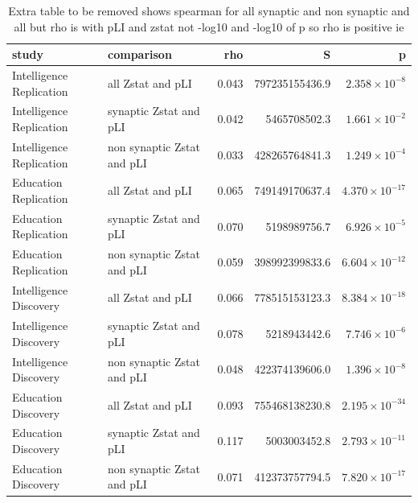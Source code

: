 \begin{table}[ht]
\centering
\begin{adjustbox}{max width=\textwidth}
\begin{tabular}{llrrr}
  \hline
study & comparison & rho & S & p \\ 
  \hline
Intelligence Replication & all Zstat and pLI & 0.043 & 797235155436.9 & $2.358 \times 10^{-8}$ \\ 
  Intelligence Replication & synaptic Zstat and pLI & 0.042 & 5465708502.3 & $1.661 \times 10^{-2}$ \\ 
  Intelligence Replication & non synaptic Zstat and pLI & 0.033 & 428265764841.3 & $1.249 \times 10^{-4}$ \\ 
  Education Replication & all Zstat and pLI & 0.065 & 749149170637.4 & $4.370 \times 10^{-17}$ \\ 
  Education Replication & synaptic Zstat and pLI & 0.070 & 5198989756.7 & $6.926 \times 10^{-5}$ \\ 
  Education Replication & non synaptic Zstat and pLI & 0.059 & 398992399833.6 & $6.604 \times 10^{-12}$ \\ 
  Intelligence Discovery & all Zstat and pLI & 0.066 & 778515153123.3 & $8.384 \times 10^{-18}$ \\ 
  Intelligence Discovery & synaptic Zstat and pLI & 0.078 & 5218943442.6 & $7.746 \times 10^{-6}$ \\ 
  Intelligence Discovery & non synaptic Zstat and pLI & 0.048 & 422374139606.0 & $1.396 \times 10^{-8}$ \\ 
  Education Discovery & all Zstat and pLI & 0.093 & 755468138230.8 & $2.195 \times 10^{-34}$ \\ 
  Education Discovery & synaptic Zstat and pLI & 0.117 & 5003003452.8 & $2.793 \times 10^{-11}$ \\ 
  Education Discovery & non synaptic Zstat and pLI & 0.071 & 412373757794.5 & $7.820 \times 10^{-17}$ \\ 
   \hline
\end{tabular}
\end{adjustbox}
\caption{Extra table to be removed shows spearman for all synaptic and non synaptic and all but rho is with pLI and zstat not -log10 and -log10 of p  so rho is positive ie}
\label{tab:Extra table to be removed shows spearman for all synaptic and non synaptic and all but rho is with pLI and zstat not -log10 and -log10 of p  so rho is positive ie}
\end{table}

